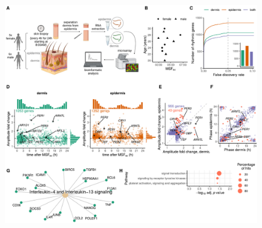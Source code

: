 \begin{figure}%
	\begin{center}
		\includegraphics[scale=0.55]{./Figures/fig1_complete.pdf}

\end{center}
\end{figure}
